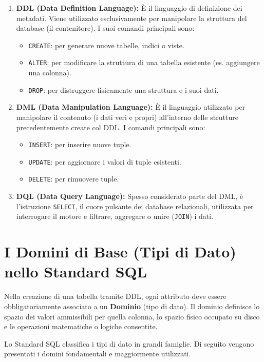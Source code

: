 \begin{enumerate}
    \item \textbf{DDL (Data Definition Language):}
    È il linguaggio di definizione dei metadati. Viene utilizzato esclusivamente per manipolare la struttura del database (il contenitore). I suoi comandi principali sono:
    \begin{itemize}
        \item \texttt{CREATE}: per generare nuove tabelle, indici o viste.
        \item \texttt{ALTER}: per modificare la struttura di una tabella esistente (es. aggiungere una colonna).
        \item \texttt{DROP}: per distruggere fisicamente una struttura e i suoi dati.
    \end{itemize}

    \item \textbf{DML (Data Manipulation Language):}
    È il linguaggio utilizzato per manipolare il contenuto (i dati veri e propri) all'interno delle strutture precedentemente create col DDL. I comandi principali sono:
    \begin{itemize}
        \item \texttt{INSERT}: per inserire nuove tuple.
        \item \texttt{UPDATE}: per aggiornare i valori di tuple esistenti.
        \item \texttt{DELETE}: per rimuovere tuple.
    \end{itemize}

    \item \textbf{DQL (Data Query Language):}
    Spesso considerato parte del DML, è l'istruzione \texttt{SELECT}, il cuore pulsante dei database relazionali, utilizzata per interrogare il motore e filtrare, aggregare o unire (\texttt{JOIN}) i dati.
\end{enumerate}

\section{I Domini di Base (Tipi di Dato) nello Standard SQL}

Nella creazione di una tabella tramite DDL, ogni attributo deve essere obbligatoriamente associato a un \textbf{Dominio} (tipo di dato). Il dominio definisce lo spazio dei valori ammissibili per quella colonna, lo spazio fisico occupato su disco e le operazioni matematiche o logiche consentite.

Lo Standard SQL classifica i tipi di dato in grandi famiglie. Di seguito vengono presentati i domini fondamentali e maggiormente utilizzati.

